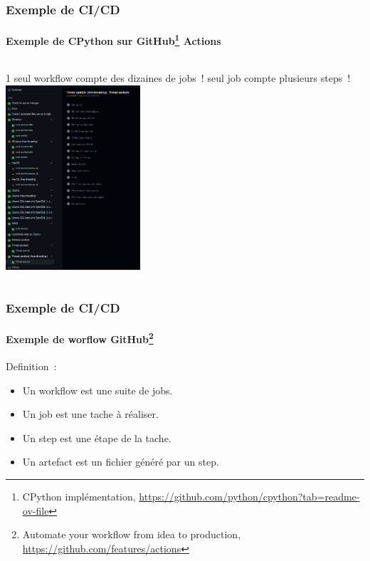 \documentclass{beamer}
\begin{document}
    \begin{frame}
        \frametitle{Exemple de CI/CD}
        \framesubtitle{Exemple de CPython sur GitHub{\footnote{CPython implémentation, \url{https://github.com/python/cpython?tab=readme-ov-file}}} Actions}
        \transdissolve
        \begin{columns}
            1 seul workflow compte des dizaines de jobs~!
             seul job compte plusieurs steps~!
            \centering
            \includegraphics[width=5cm]{image/cpython-workflow-jobs.png}
        \end{columns}
    \end{frame}

    \begin{frame}
        \frametitle{Exemple de CI/CD}
        \framesubtitle{Exemple de worflow GitHub{\footnote{Automate your workflow from idea to production, \url{https://github.com/features/actions}}}}
        \transdissolve

        Definition~:
        \begin{itemize}
            \item Un workflow est une suite de jobs.
            \item Un job est une tache à réaliser.
            \item Un step est une étape de la tache.
            \item Un artefact est un fichier généré par un step.
        \end{itemize}
    \end{frame}
\end{document}

